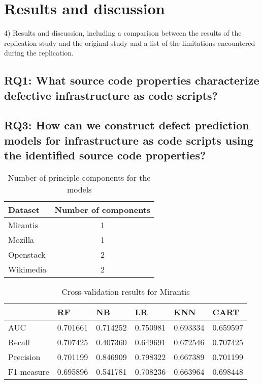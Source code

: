 
\section{Results and discussion}
4) Results and discussion, including a comparison between the results of the 
replication study and the original study and a list of the limitations 
encountered during the replication.
\subsection{RQ1: What source code properties characterize defective 
infrastructure as code scripts?}

\subsection{RQ3: How can we construct defect prediction models for 
infrastructure as code scripts using the identified source code properties?}


\begin{table}[h]
  \caption{Number of principle components for the models}
  \label{table:pca}
    \centering
    \begin{tabular}{|l|c|}
    \hline
        Dataset   & Number of components \\ \hline
        Mirantis  & 1 \\ \hline
        Mozilla   & 1 \\ \hline
        Openstack & 2 \\ \hline
        Wikimedia & 2 \\ \hline
    \end{tabular}
\end{table}




\begin{table}[h]
  \caption{Cross-validation results for Mirantis}
  \label{table:mirantis-models}
    \centering
    \begin{tabular}{|l|l|l|l|l|l|}
    \hline
        ~ & RF & NB & LR & KNN & CART \\ \hline
        AUC & 0.701661 & 0.714252 & 0.750981 & 0.693334 & 0.659597 \\ \hline
        Recall & 0.707425 & 0.407360 & 0.649691 & 0.672546 & 0.707425 \\ \hline
        Precision & 0.701199 & 0.846909 & 0.798322 & 0.667389 & 0.701199 \\ \hline
        F1-measure  & 0.695896 & 0.541781 & 0.708236 & 0.663964 & 0.698448 \\ \hline
    \end{tabular}
\end{table}

